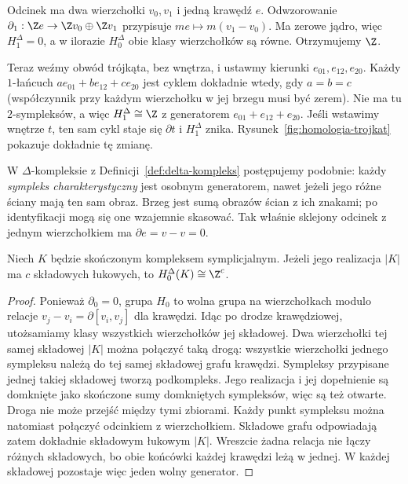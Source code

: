 \begin{przyklad}
\label{prz:homologia-odcinek-okrag}
Odcinek ma dwa wierzchołki $v_0,v_1$
i jedną krawędź $e$. Odwzorowanie
$\partial_1:\Z e\to\Z v_0\oplus\Z v_1$
przypisuje $me\mapsto m(v_1-v_0)$.
Ma zerowe jądro, więc $H_1^\Delta=0$,
a w ilorazie $H_0^\Delta$ obie klasy
wierzchołków są równe. Otrzymujemy $\Z$.

Teraz weźmy obwód trójkąta, bez wnętrza,
i ustawmy kierunki $e_{01},e_{12},e_{20}$.
Każdy $1$-łańcuch
$ae_{01}+be_{12}+ce_{20}$ jest cyklem
dokładnie wtedy, gdy $a=b=c$
(współczynnik przy każdym wierzchołku
w jej brzegu musi być zerem).
Nie ma tu $2$-sympleksów, a więc
$H_1^\Delta\cong\Z$ z generatorem
$e_{01}+e_{12}+e_{20}$.
Jeśli wstawimy wnętrze $t$, ten sam
cykl staje się $\partial t$ i
$H_1^\Delta$ znika. Rysunek~\ref{fig:homologia-trojkat}
pokazuje dokładnie tę zmianę.
\end{przyklad}

W $\Delta$-kompleksie z
Definicji~\ref{def:delta-kompleks} postępujemy
podobnie: każdy \emph{sympleks charakterystyczny}
jest osobnym generatorem, nawet jeżeli jego
różne ściany mają ten sam obraz. Brzeg
jest sumą obrazów ścian z ich znakami;
po identyfikacji mogą się one wzajemnie
skasować. Tak właśnie sklejony odcinek
z jednym wierzchołkiem ma $\partial e=v-v=0$.

\begin{stwierdzenie}[Składowe i $H_0$]
\label{prop:h0-symplicjalne}
Niech $K$ będzie skończonym kompleksem symplicjalnym.
Jeżeli jego realizacja $|K|$ ma $c$ składowych łukowych,
to $H_0^\Delta(K)\cong\Z^c$.
\end{stwierdzenie}
\begin{proof}
Ponieważ $\partial_0=0$, grupa $H_0$
to wolna grupa na wierzchołkach
modulo relacje
$v_j-v_i=\partial[v_i,v_j]$
dla krawędzi. Idąc po drodze krawędziowej,
utożsamiamy klasy wszystkich wierzchołków
jej składowej. Dwa wierzchołki tej samej
składowej $|K|$ można połączyć taką drogą:
wszystkie wierzchołki jednego sympleksu należą do tej samej
składowej grafu krawędzi. Sympleksy przypisane jednej takiej
składowej tworzą podkompleks. Jego realizacja i jej dopełnienie
są domknięte jako skończone sumy domkniętych sympleksów,
więc są też otwarte. Droga nie może przejść między tymi zbiorami.
Każdy punkt sympleksu można natomiast połączyć odcinkiem z wierzchołkiem.
Składowe grafu odpowiadają zatem dokładnie składowym łukowym $|K|$. Wreszcie żadna
relacja nie łączy różnych składowych,
bo obie końcówki każdej krawędzi leżą
w jednej. W każdej składowej pozostaje
więc jeden wolny generator.
\end{proof}

